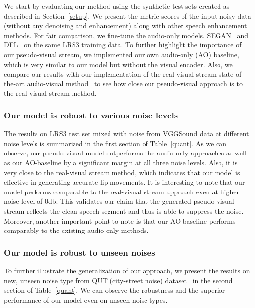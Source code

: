 \documentclass[10pt,twocolumn,letterpaper]{article}
\begin{document}
We start by evaluating our method using the synthetic test sets created as described in Section~\ref{setup}.  We present the metric scores of the input noisy data (without any denoising and enhancement) along with other speech enhancement methods. For fair comparison, we fine-tune the audio-only models, SEGAN~\cite{segan} and DFL~\cite{Germain2019SpeechDW} on the same LRS3 training data. To further highlight the importance of our pseudo-visual stream, we implemented our own audio-only (AO) baseline, which is very similar to our model but without the visual encoder. Also, we compare our results with our implementation of the real-visual stream state-of-the-art audio-visual method~\cite{TheConversation_Afouras_2018} to see how close our pseudo-visual approach is to the real visual-stream method. 

\subsubsection{Our model is robust to various noise levels}
The results on LRS3 test set mixed with noise from VGGSound data at different noise levels is summarized in the first section of Table~\ref{quant}. As we can observe, our pseudo-visual model outperforms the audio-only approaches as well as our AO-baseline by a significant margin at all three noise levels. Also, it is very close to the real-visual stream method, which indicates that our model is effective in generating accurate lip movements. It is interesting to note that our model performs comparable to the real-visual stream approach even at higher noise level of 0db. This validates our claim that the generated pseudo-visual stream reflects the clean speech segment and thus is able to suppress the noise. Moreover, another important point to note is that our AO-baseline performs comparably to the existing audio-only methods. 

\subsubsection{Our model is robust to unseen noises}
To further illustrate the generalization of our approach, we present the results on new, unseen noise type from QUT (city-street noise) dataset~\cite{Dean2010TheQC} in the second section of Table~\ref{quant}. We can observe the robustness and the superior performance of our model even on unseen noise types. 
\end{document}
